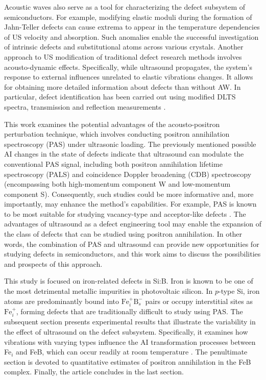 \documentclass{ttp}
\begin{document}
Acoustic waves also serve as a tool for characterizing the defect subsystem of semiconductors.
For example, modifying elastic moduli during the formation of Jahn-Teller defects can cause extrema to appear in the temperature dependencies of US velocity and absorption.
Such anomalies enable the successful investigation of intrinsic defects \cite{USM:Mitsumoto2014, USM:SEYIDOV2016}
and substitutional atoms \cite{USM:Zhevstovskikh, USM:YI2009} across various crystals.
Another approach to US modification of traditional defect research methods involves acousto-dynamic effects.
Specifically, while ultrasound propagates, the system's response to external influences unrelated to elastic vibrations changes.
It allows for obtaining more detailed information about defects than without AW.
In particular, defect identification has been carried out using modified DLTS spectra,
transmission and reflection measurements \cite{Kor1996, Ostrovskii2001, OSTROVSKII2000, SST:USmethod}.

This work examines the potential advantages of the acousto-positron perturbation technique,
which involves conducting positron annihilation spectroscopy (PAS) under ultrasonic loading.
The previously mentioned possible AI changes in the state of defects indicate that ultrasound can modulate the conventional PAS signal,
including both positron annihilation lifetime spectroscopy (PALS) and coincidence Doppler broadening (CDB) spectroscopy
(encompassing both high-momentum component W and low-momentum component S).
Consequently, such studies could be more informative and, more importantly, may enhance the method's capabilities.
For example, PAS is known to be most suitable for studying vacancy-type and acceptor-like defects \cite{tuomisto2019}.
The advantages of ultrasound as a defect engineering tool \cite{Olikh2018JAP} may enable the expansion
of the class of defects that can be studied using positron annihilation.
In other words, the combination of PAS and ultrasound can provide new opportunities for studying defects in semiconductors,
and this work aims to discuss the possibilities and prospects of this approach.

This study is focused on iron-related defects in Si:B.
Iron is known to be one of the most detrimental metallic impurities in photovoltaic silicon.
In $p$-type Si, iron atoms are predominantly bound into $\mathrm{Fe}_i^+\mathrm{B}_s^−$ pairs
or occupy interstitial sites as $\mathrm{Fe}_i^+$,
forming defects that are traditionally difficult to study using PAS.
The subsequent section presents experimental results that illustrate the variability in the effect of ultrasound on the defect subsystem.
Specifically, it examines how vibrations with varying types influence the AI transformation processes
between Fe$_i$ and FeB, which can occur readily at room temperature \cite{FeBAssJAP2014}.
The penultimate section is devoted to quantitative estimates of positron annihilation in the FeB complex.
Finally, the article concludes in the last section.
\end{document}
